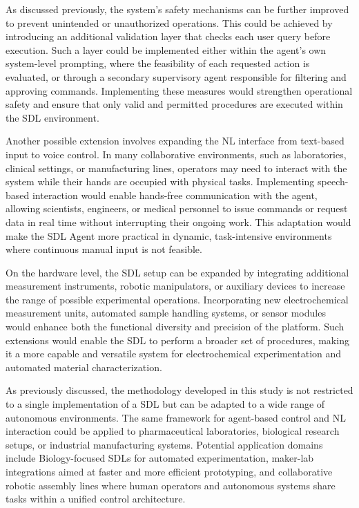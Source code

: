 As discussed previously, the system’s safety mechanisms can be further improved to prevent unintended or unauthorized operations. This could be achieved by introducing an additional validation layer that checks each user query before execution. Such a layer could be implemented either within the agent’s own system-level prompting, where the feasibility of each requested action is evaluated, or through a secondary supervisory agent responsible for filtering and approving commands. Implementing these measures would strengthen operational safety and ensure that only valid and permitted procedures are executed within the SDL environment.

Another possible extension involves expanding the NL interface from text-based input to voice control. In many collaborative environments, such as laboratories, clinical settings, or manufacturing lines, operators may need to interact with the system while their hands are occupied with physical tasks. Implementing speech-based interaction would enable hands-free communication with the agent, allowing scientists, engineers, or medical personnel to issue commands or request data in real time without interrupting their ongoing work. This adaptation would make the SDL Agent more practical in dynamic, task-intensive environments where continuous manual input is not feasible.

On the hardware level, the SDL setup can be expanded by integrating additional measurement instruments, robotic manipulators, or auxiliary devices to increase the range of possible experimental operations. Incorporating new electrochemical measurement units, automated sample handling systems, or sensor modules would enhance both the functional diversity and precision of the platform. Such extensions would enable the SDL to perform a broader set of procedures, making it a more capable and versatile system for electrochemical experimentation and automated material characterization.

As previously discussed, the methodology developed in this study is not restricted to a single implementation of a SDL but can be adapted to a wide range of autonomous environments. The same framework for agent-based control and NL interaction could be applied to pharmaceutical laboratories, biological research setups, or industrial manufacturing systems. Potential application domains include Biology-focused SDLs for automated experimentation, maker-lab integrations aimed at faster and more efficient prototyping, and collaborative robotic assembly lines where human operators and autonomous systems share tasks within a unified control architecture.

